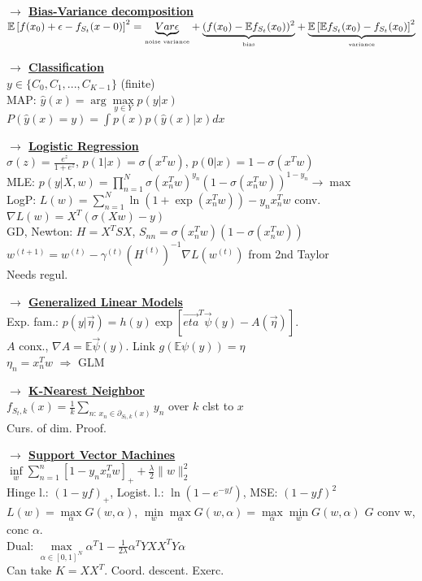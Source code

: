 \documentclass[11pt]{article}
\newcommand{\underlabel}[2]{\underset{\mbox{\tiny #2}}{\underbrace{#1}}}
\newcommand{\mytitle}[1]{ {\bf $\rightarrow$ \underline{#1}}\\}
\begin{document}
\begin{multicols*}{2}
\mytitle{Bias-Variance decomposition}
$\mathbb{E}\left[f(x_0)+\epsilon-f_{S_t}(x-0)\right]^2=\underlabel{Var\epsilon}{noise variance}+\underlabel{(f(x_0)-\mathbb{E}f_{S_t}(x_0))^2}{bias}+\underlabel{\mathbb{E}\left[\mathbb{E}f_{S_t}(x_0)-f_{S_t}(x_0)\right]^2}{variance}$

\mytitle{Classification}
$y\in \{C_0,C_1,...,C_{K-1}\}$ (finite)\\
MAP: $\hat{y}(x)=\arg\max\limits_{y\in Y}p(y|x)$\\
$P(\hat{y}(x)=y)=\int p(x)p(\hat{y}(x)|x)dx$


\mytitle{Logistic Regression}
$\sigma(z)=\frac{e^z}{1+e^z}$, $p(1|x)=\sigma(x^Tw)$, $p(0|x)=1-\sigma(x^Tw)$\\
MLE: $p(y|X,w)=\prod\limits_{n=1}^N\sigma(x_n^Tw)^{y_n}\left(1-\sigma(x_n^Tw)\right)^{1-y_n}\to\max$\\
LogP: $L(w)=\sum\limits_{n=1}^N\ln(1+\exp(x_n^Tw))-y_nx_n^Tw$ conv.\\
$\nabla L(w)=X^T(\sigma(Xw)-y)$\\
GD, Newton: $H=X^TSX$, $S_{nn}=\sigma(x_n^Tw)(1-\sigma(x_n^Tw))$\\
$w^{(t+1)}=w^{(t)}-\gamma^{(t)}(H^{(t)})^{-1}\nabla L(w^{(t)})$ from 2nd Taylor\\
Needs regul.

\mytitle{Generalized Linear Models}
Exp. fam.: $p(y|\vec{\eta})=h(y)\exp\left[\vec{eta}^T\vec{\psi}(y)-A(\vec{\eta})\right]$.\\
$A$ conx., $\nabla A=\mathbb{E}\vec{\psi}(y)$. Link $g(\mathbb{E}\psi(y))=\eta$\\
$\eta_n=x_n^Tw$ $\Rightarrow$ GLM

\mytitle{K-Nearest Neighbor}
$f_{S_t,k}(x)=\frac{1}{k}\sum\limits_{n\colon\,x_n\in \partial_{S_t,k}(x)}y_n$ over $k$ clst to $x$\\
Curs. of dim. Proof.

\mytitle{Support Vector Machines}
$\inf\limits_w\sum\limits_{n=1}^n\left[1-y_nx_n^Tw\right]_++\frac{\lambda}{2}\|w\|^2_2$\\
Hinge l.: $(1-yf)_+$, Logist. l.: $\ln(1-e^{-yf})$, MSE: $(1-yf)^2$\\
$L(w)=\max\limits_\alpha G(w,\alpha)$, $\min\limits_w\max\limits_\alpha G(w,\alpha)=\max\limits_\alpha\min\limits_w G(w,\alpha)$
$G$ conv w, conc $\alpha$.\\
Dual: $\max\limits_{\alpha\in[0,1]^N}\alpha^T1-\frac{1}{2\lambda}\alpha^TYXX^TY\alpha$\\
Can take $K=XX^T$. Coord. descent. Exerc.


\end{multicols*}
\end{document}
